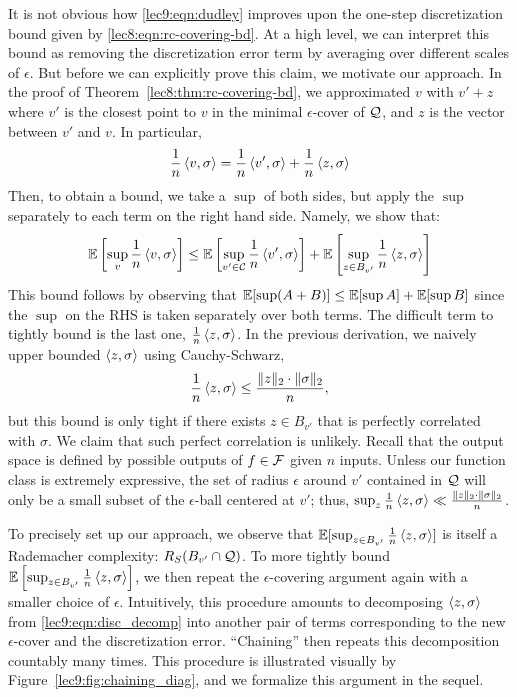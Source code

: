 It is not obvious how \eqref{lec9:eqn:dudley} improves upon the one-step discretization bound given by \eqref{lec8:eqn:rc-covering-bd}. At a high level, we can interpret this bound as removing the discretization error term by averaging over different scales of $\epsilon$.  But before we can explicitly prove this claim, we motivate our approach. In the proof of Theorem~\ref{lec8:thm:rc-covering-bd}, we approximated $v$ with $v' + z$ where $v'$ is the closest point to $v$ in the minimal $\epsilon$-cover of $\mathcal Q$, and $z$ is the vector between $v'$ and $v$. In particular,
\begin{equation}
    \frac 1 n \left\langle v, \sigma\right\rangle = \frac 1 n \left\langle v', \sigma\right\rangle + \frac 1 n \left\langle z, \sigma\right\rangle \label{lec9:eqn:disc_decomp}
\end{equation}
Then, to obtain a bound, we take a $\sup$ of both sides, but apply the $\sup$ separately to each term on the right hand side. Namely, we show that:
\begin{align}
    \operatorname*{\mathbb{E}} \left[\sup_v \frac{1}{n} \left\langle v, \sigma\right\rangle \right] \leq \operatorname*{\mathbb{E}} \left[\sup_{v' \in \mathcal C} \frac 1 n \left\langle v', \sigma\right\rangle \right ] + \operatorname*{\mathbb{E}} \left[ \sup_{z \in B_{v'}} \frac{1}{n} \left\langle z, \sigma\right\rangle \right]
\end{align}
This bound follows by observing that $\operatorname*{\mathbb{E}}[\sup (A + B)] \leq \operatorname*{\mathbb{E}}[\sup A] + \operatorname*{\mathbb{E}}[\sup B]$ since the $\sup$ on the RHS is taken separately over both terms. The difficult term to tightly bound is the last one, $\frac 1 n \left\langle z, \sigma\right\rangle$. In the previous derivation, we naively upper bounded $\left\langle z, \sigma\right\rangle$ using Cauchy-Schwarz,
\begin{equation}
    \frac 1 n \left\langle z,\sigma\right\rangle \le \frac{\|z\|_2\cdot \|\sigma\|_2} n,
\end{equation}
but this bound is only tight if there exists $z \in B_{v'}$ that is perfectly correlated with $\sigma$. We claim that such perfect correlation is unlikely. Recall that the output space is defined by possible outputs of $f \in \mathcal F$ given $n$ inputs. Unless our function class is extremely expressive, the set of radius $\epsilon$ around $v'$ contained in $\mathcal Q$ will only be a small subset of the $\epsilon$-ball centered at $v'$; thus, $\sup_{z} \frac{1}{n} \left\langle z, \sigma\right\rangle \ll \frac{\|z\|_2 \cdot \|\sigma\|_2}{n}$.

To precisely set up our approach, we observe that $\operatorname*{\mathbb{E}}[\sup_{z \in B_{v'}} \frac 1 n \left\langle z, \sigma\right\rangle]$ is itself a Rademacher complexity: $R_S(B_{v'} \cap \mathcal Q)$. To more tightly bound $\operatorname*{\mathbb{E}} \left[ \sup_{z \in B_{v'}} \frac 1 n \left\langle z,\sigma\right\rangle\right]$, we then repeat the $\epsilon$-covering argument again with a smaller choice of $\epsilon$. Intuitively, this procedure amounts to decomposing $\left\langle z, \sigma\right\rangle$ from \eqref{lec9:eqn:disc_decomp} into another pair of terms corresponding to the new $\epsilon$-cover and the discretization error. ``Chaining'' then repeats this decomposition countably many times. This procedure is illustrated visually by Figure~\ref{lec9:fig:chaining_diag}, and we formalize this argument in the sequel.

